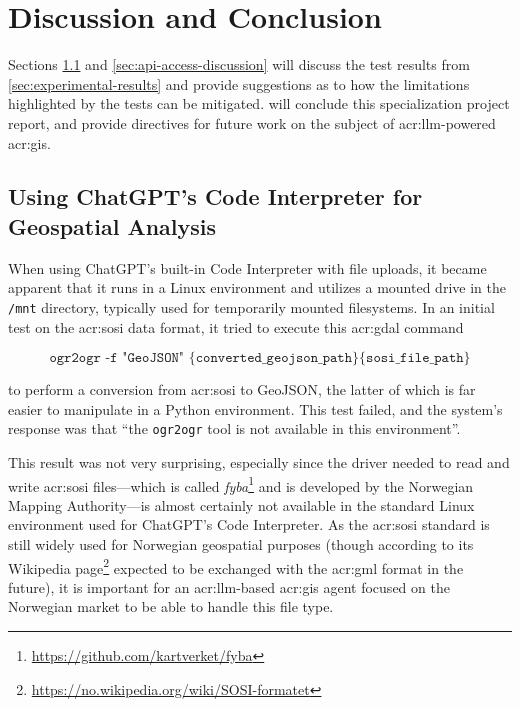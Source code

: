 \chapter{Discussion and Conclusion}\label{cha:discussion-and-conclusion}

Sections \ref{sec:code-interpreter-discussion} and \ref{sec:api-access-discussion} will discuss the test results from \autoref{sec:experimental-results} and provide suggestions as to how the limitations highlighted by the tests can be mitigated.  will conclude this specialization project report, and provide directives for future work on the subject of \acrshort{acr:llm}-powered \acrshort{acr:gis}.

\section{Using ChatGPT's Code Interpreter for Geospatial Analysis}\label{sec:code-interpreter-discussion}

When using ChatGPT's built-in Code Interpreter with file uploads, it became apparent that it runs in a Linux environment and utilizes a mounted drive in the \texttt{/mnt} directory, typically used for temporarily mounted filesystems. In an initial test on the \acrshort{acr:sosi} data format, it tried to execute this \acrshort{acr:gdal} command

$$
    \texttt{ogr2ogr -f "GeoJSON" \{converted\_geojson\_path\} \{sosi\_file\_path\}}
$$

\noindent to perform a conversion from \acrshort{acr:sosi} to GeoJSON, the latter of which is far easier to manipulate in a Python environment. This test failed, and the system's response was that \enquote{the \texttt{ogr2ogr} tool is not available in this environment}.

This result was not very surprising, especially since the driver needed to read and write \acrshort{acr:sosi} files---which is called \textit{fyba}\footnote{\url{https://github.com/kartverket/fyba}} and is developed by the Norwegian Mapping Authority---is almost certainly not available in the standard Linux environment used for ChatGPT's Code Interpreter. As the \acrshort{acr:sosi} standard is still widely used for Norwegian geospatial purposes (though according to its Wikipedia page\footnote{\url{https://no.wikipedia.org/wiki/SOSI-formatet}} expected to be exchanged with the \acrshort{acr:gml} format in the future), it is important for an \acrshort{acr:llm}-based \acrshort{acr:gis} agent focused on the Norwegian market to be able to handle this file type.

